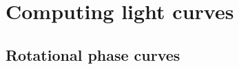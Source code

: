 \documentclass[modern]{aastex61}
\begin{document}
\section{Computing light curves}
\label{sec:lightcurves}
%
\subsection{Rotational phase curves}
\label{sec:phasecurves}
\end{document}
